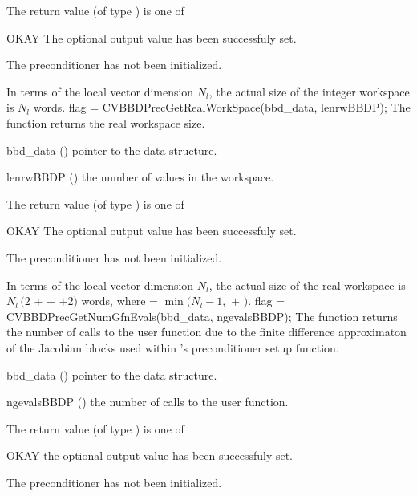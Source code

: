 {
  The return value  (of type ) is one of
  \begin{args}
  \item[OKAY] 
    The optional output value has been successfuly set.
  \item[\Id{BBDP\_NO\_DATA}]
    The {\cvbbdpre} preconditioner has not been initialized.
  \end{args}
}
{
  In terms of the local vector dimension $N_{l}$, the actual size of the integer workspace
  is $N_l$  words.
}
{
  flag = CVBBDPrecGetRealWorkSpace(bbd\_data, lenrwBBDP);
}
{
  The function  returns the
  {\cvbbdpre} real workspace size.
}
{
  \begin{args}[lenrwBBDP]
  \item[bbd\_data] ()
    pointer to the {\cvbbdpre} data structure.
  \item[lenrwBBDP] ()
    the number of  values in the {\cvbbdpre} workspace.
  \end{args}
}
{
  The return value  (of type ) is one of
  \begin{args}
  \item[OKAY] 
    The optional output value has been successfuly set.
  \item[\Id{BBDP\_NO\_DATA}]
    The {\cvbbdpre} preconditioner has not been initialized.
  \end{args}
}
{
  In terms of the local vector dimension $N_l$, the actual size of the real workspace is
  $N_l \,(2$  $+$  $+$  $+2)$  words,
  where  = $\min ( N_l - 1 ,$  $+$ $)$.
}
{
  flag = CVBBDPrecGetNumGfnEvals(bbd\_data, ngevalsBBDP);
}
{
  The function  returns the
  number of calls to the user  function due to the 
  finite difference approximaton of the Jacobian blocks used within
  {\cvbbdpre}'s preconditioner setup function.
}
{
  \begin{args}[ngevalsBBDP]
  \item[bbd\_data] ()
    pointer to the {\cvbbdpre} data structure.
  \item[ngevalsBBDP] ()
    the number of calls to the user  function.
  \end{args}
}
{
  The return value  (of type ) is one of
  \begin{args}
  \item[OKAY] 
    the optional output value has been successfuly set.
  \item[\Id{BBDP\_NO\_DATA}]
    The {\cvbbdpre} preconditioner has not been initialized.
  \end{args}
}
{}

